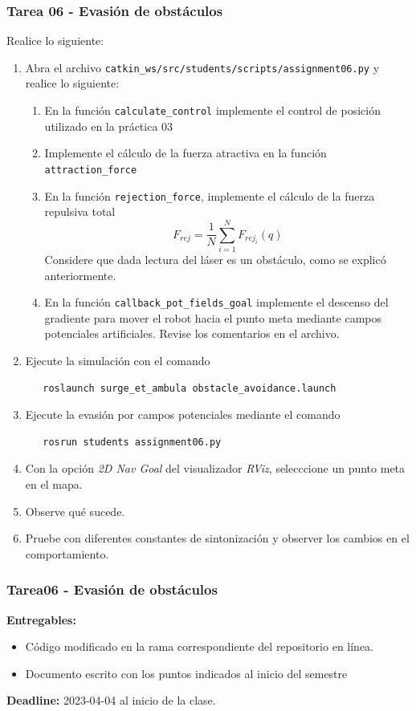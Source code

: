 \begin{frame}[containsverbatim]\frametitle{Tarea 06 - Evasión de obstáculos}
Realice lo siguiente:
  \begin{enumerate}
  \item Abra el archivo \texttt{catkin\_ws/src/students/scripts/assignment06.py} y realice lo siguiente:
    \begin{enumerate}
    \item En la función \texttt{calculate\_control} implemente el control de posición utilizado en la práctica 03
    \item Implemente el cálculo de la fuerza atractiva en la función \texttt{attraction\_force}
    \item En la función \texttt{rejection\_force}, implemente el cálculo de la fuerza repulsiva total
      \[F_{rej} = \frac{1}{N}\sum_{i=1}^N F_{rej_i}(q)\]
      Considere que dada lectura del láser es un obstáculo, como se explicó anteriormente.
    \item En la función \texttt{callback\_pot\_fields\_goal} implemente el descenso del gradiente para mover el robot hacia el punto meta mediante campos potenciales artificiales. Revise los comentarios en el archivo. 
    \end{enumerate}
  \item Ejecute la simulación con el comando
    \begin{verbatim}
   roslaunch surge_et_ambula obstacle_avoidance.launch
\end{verbatim}
  \item Ejecute la evasión por campos potenciales mediante el comando
\begin{verbatim}
   rosrun students assignment06.py
\end{verbatim}
  \item Con la opción \textit{2D Nav Goal} del visualizador \textit{RViz}, selecccione un punto meta en el mapa.
  \item Observe qué sucede.
  \item Pruebe con diferentes constantes de sintonización y observer los cambios en el comportamiento. 
  \end{enumerate}
\end{frame}

\begin{frame}[containsverbatim]\frametitle{Tarea06 - Evasión de obstáculos}
 \textbf{Entregables:}
  \begin{itemize}
  \item Código modificado en la rama correspondiente del repositorio en línea.
  \item Documento escrito con los puntos indicados al inicio del semestre
  \end{itemize}
  \textbf{Deadline: } 2023-04-04 al inicio de la clase. 
\end{frame}

